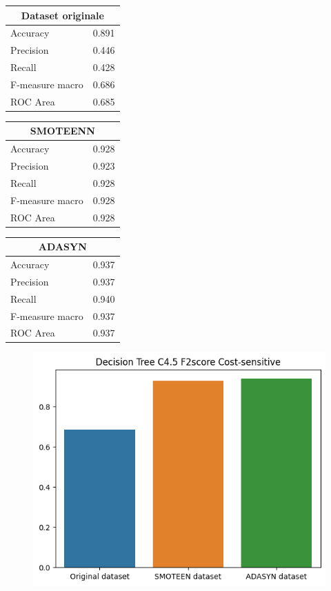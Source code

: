 \documentclass[italian,12pt,a4paper]{article}
\begin{document}
		\begin{center}
		
		\begin{table}[h]
			\footnotesize
			\begin{tabular}{|p{2cm}|c|}
				\hline
				\multicolumn{2}{|c|}{Dataset originale}\\ \hline
				Accuracy & 0.891 \\ \hline
				Precision & 0.446 \\ \hline
				Recall & 0.428 \\ \hline
				F-measure macro & 0.686 \\ \hline
				ROC Area & 0.685 \\ \hline  
			\end{tabular}
			\hfill
			\begin{tabular}{|p{2cm}|c|}
				\hline
				\multicolumn{2}{|c|}{SMOTEENN}\\ \hline
				Accuracy & 0.928 \\ \hline
				Precision & 0.923 \\ \hline
				Recall & 0.928 \\ \hline
				F-measure macro & 0.928 \\ \hline
				ROC Area & 0.928 \\ \hline  
			\end{tabular}
			\hfill
			\begin{tabular}{|p{2cm}|r|} \hline
				\multicolumn{2}{|c|}{ADASYN}\\ \hline
				Accuracy & 0.937 \\ \hline
				Precision & 0.937 \\ \hline
				Recall & 0.940 \\ \hline
				F-measure macro & 0.937 \\ \hline
				ROC Area & 0.937 \\ \hline  
			\end{tabular}
		\end{table}
		\begin{figure}[h]
			\centering
			\includegraphics[scale=0.73]{DecTreeCostSens}
		\end{figure}
	\end{center}
	
\end{document}
